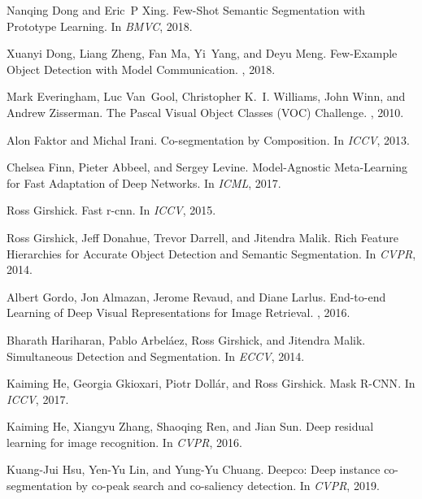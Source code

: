 \documentclass{article}
\begin{document}
{\begin{thebibliography}{10}
Nanqing Dong and Eric~P Xing.
\newblock Few-{Shot} {Semantic} {Segmentation} with {Prototype} {Learning}.
\newblock In {\em {BMVC}}, 2018.

Xuanyi Dong, Liang Zheng, Fan Ma, Yi~Yang, and Deyu Meng.
\newblock Few-{Example} {Object} {Detection} with {Model} {Communication}.
, 2018.

Mark Everingham, Luc Van~Gool, Christopher K.~I. Williams, John Winn, and
  Andrew Zisserman.
\newblock The {Pascal} {Visual} {Object} {Classes} ({VOC}) {Challenge}.
, 2010.

Alon Faktor and Michal Irani.
\newblock Co-segmentation by {Composition}.
\newblock In {\em {ICCV}}, 2013.

Chelsea Finn, Pieter Abbeel, and Sergey Levine.
\newblock Model-{Agnostic} {Meta}-{Learning} for {Fast} {Adaptation} of {Deep}
  {Networks}.
\newblock In {\em ICML}, 2017.

Ross Girshick.
\newblock Fast r-cnn.
\newblock In {\em {ICCV}}, 2015.

Ross Girshick, Jeff Donahue, Trevor Darrell, and Jitendra Malik.
\newblock Rich {Feature} {Hierarchies} for {Accurate} {Object} {Detection} and
  {Semantic} {Segmentation}.
\newblock In {\em {CVPR}}, 2014.

Albert Gordo, Jon Almazan, Jerome Revaud, and Diane Larlus.
\newblock End-to-end {Learning} of {Deep} {Visual} {Representations} for
  {Image} {Retrieval}.
, 2016.

Bharath Hariharan, Pablo Arbeláez, Ross Girshick, and Jitendra Malik.
\newblock Simultaneous {Detection} and {Segmentation}.
\newblock In {\em {ECCV}}, 2014.

Kaiming He, Georgia Gkioxari, Piotr Dollár, and Ross Girshick.
\newblock Mask {R}-{CNN}.
\newblock In {\em {ICCV}}, 2017.

Kaiming He, Xiangyu Zhang, Shaoqing Ren, and Jian Sun.
\newblock Deep residual learning for image recognition.
\newblock In {\em {CVPR}}, 2016.

Kuang-Jui Hsu, Yen-Yu Lin, and Yung-Yu Chuang.
\newblock Deepco: Deep instance co-segmentation by co-peak search and
  co-saliency detection.
\newblock In {\em {CVPR}}, 2019.


\end{thebibliography}}
\end{document}
